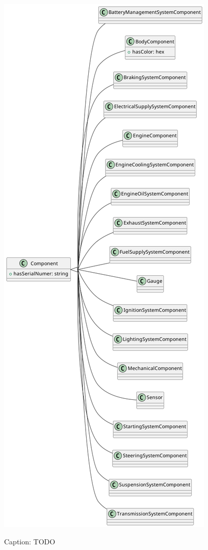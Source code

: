 \begin{figure}[H]
    \caption{Caption: TODO}
    \includegraphics[height=\textheight]{figures/carpedia-component.png}
    \label{fig:carpedia-component}
\end{figure}

